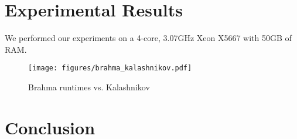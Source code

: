 \documentclass[a4paper]{llncs}
\begin{document}
\section{Experimental Results}

We performed our experiments on a 4-core, 3.07GHz Xeon X5667 with 50GB of RAM.

\begin{figure}
 \texttt{[image: figures/brahma\_kalashnikov.pdf]}
 \label{fig:brahma-kalashnikov}
 \caption{Brahma runtimes vs. Kalashnikov}
\end{figure}


\section{Conclusion}
\end{document}
